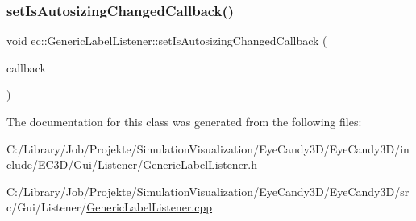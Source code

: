 \subsubsection{\texorpdfstring{set\+Is\+Autosizing\+Changed\+Callback()}{setIsAutosizingChangedCallback()}}
{\footnotesize\ttfamily void ec\+::\+Generic\+Label\+Listener\+::set\+Is\+Autosizing\+Changed\+Callback (\begin{DoxyParamCaption}\item[{const \mbox{\hyperlink{classec_1_1_generic_label_listener_adf4cec1bd13682ce66c52f0484fe46c6}{Is\+Autosizing\+Changed\+\_\+\+Callback}} \&}]{callback }\end{DoxyParamCaption})}



The documentation for this class was generated from the following files\+:\begin{DoxyCompactItemize}
\item 
C\+:/\+Library/\+Job/\+Projekte/\+Simulation\+Visualization/\+Eye\+Candy3\+D/\+Eye\+Candy3\+D/include/\+E\+C3\+D/\+Gui/\+Listener/\mbox{\hyperlink{_generic_label_listener_8h}{Generic\+Label\+Listener.\+h}}\item 
C\+:/\+Library/\+Job/\+Projekte/\+Simulation\+Visualization/\+Eye\+Candy3\+D/\+Eye\+Candy3\+D/src/\+Gui/\+Listener/\mbox{\hyperlink{_generic_label_listener_8cpp}{Generic\+Label\+Listener.\+cpp}}\end{DoxyCompactItemize}
